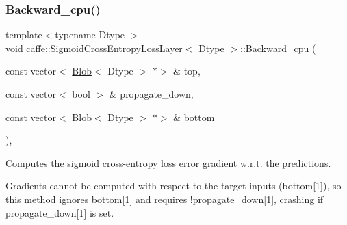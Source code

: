 \subsubsection{\texorpdfstring{Backward\+\_\+cpu()}{Backward\_cpu()}\hspace{0.1cm}{\footnotesize\ttfamily [1/2]}}
{\footnotesize\ttfamily template$<$typename Dtype $>$ \\
void \mbox{\hyperlink{classcaffe_1_1_sigmoid_cross_entropy_loss_layer}{caffe\+::\+Sigmoid\+Cross\+Entropy\+Loss\+Layer}}$<$ Dtype $>$\+::Backward\+\_\+cpu (\begin{DoxyParamCaption}\item[{const vector$<$ \mbox{\hyperlink{classcaffe_1_1_blob}{Blob}}$<$ Dtype $>$ $\ast$$>$ \&}]{top,  }\item[{const vector$<$ bool $>$ \&}]{propagate\+\_\+down,  }\item[{const vector$<$ \mbox{\hyperlink{classcaffe_1_1_blob}{Blob}}$<$ Dtype $>$ $\ast$$>$ \&}]{bottom }\end{DoxyParamCaption})\hspace{0.3cm}{\ttfamily [protected]}, {\ttfamily [virtual]}}



Computes the sigmoid cross-\/entropy loss error gradient w.\+r.\+t. the predictions. 

Gradients cannot be computed with respect to the target inputs (bottom\mbox{[}1\mbox{]}), so this method ignores bottom\mbox{[}1\mbox{]} and requires !propagate\+\_\+down\mbox{[}1\mbox{]}, crashing if propagate\+\_\+down\mbox{[}1\mbox{]} is set.


